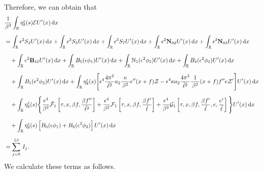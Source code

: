 \documentclass[10pt, reqno]{amsart}
\numberwithin{equation}{section}
\theoremstyle{definition}
\begin{document}
{Therefore, we can obtain that
\begin{align}
& \frac{1}{\beta^3}\int_{\mathbb R}\eta_\delta^\epsilon(s){\mathcal E}U'(x) \,{\mathrm d}x
\nonumber\\[2mm]
& = \int_{{\mathbb R}}\epsilon^2 S_{3} U'(x)\,{\mathrm d}x
+\int_{{\mathbb R}}\epsilon^3 S_{5}U'(x)\,{\mathrm d}x
+\int_{{\mathbb R}}\epsilon^3 S_{7}U'(x)\,{\mathrm d}x
+\int_{{\mathbb R}}\epsilon^2 {\bf N}_{02}U'(x)\,{\mathrm d}x
+\int_{{\mathbb R}}\epsilon^3 {\bf N}_{03}U'(x)\,{\mathrm d}x
\nonumber\\[2mm]
& \quad
+\int_{{\mathbb R}}\epsilon^2 {\bf B}_{42} U'(x)\,{\mathrm d}x
+\int_{{\mathbb R}}B_{5}(\epsilon\phi_1)U'(x)\,{\mathrm d}x
+\int_{{\mathbb R}}\mathbb{N}_1 (\epsilon^2 \phi_2)U'(x)\,{\mathrm d}x
+\int_{{\mathbb R}}B_4(\epsilon^2\phi_2)U'(x)\,{\mathrm d}x
\nonumber\\[2mm]
& \quad
+\int_{{\mathbb R}}B_5 (\epsilon^2{\phi_2}) U'(x)\,{\mathrm d}x
 + \int_{\mathbb R} \eta_\delta^\epsilon(s) \Bigg[ \epsilon^4 \frac{4\pi^2} {{\tilde\ell}^2} a_2\frac{\kappa}{\, \beta^2\, } e'' (x+f)\mathcal Z
 -\epsilon^4 \kappa a_2 \frac{ 4\pi^2} {{\tilde\ell}^2} \frac{1}{\, \beta^2\, } (x+f) f'' e \mathcal Z' \Bigg]U'(x)\,{\mathrm d}x
\nonumber\\[2mm]
& \quad
  + \int_{\mathbb R} \eta_\delta^\epsilon(s)\Bigg\{\frac{\epsilon^4}{\beta^2} \hat{\mathcal F}_1\left[\tau, x, \beta f, \frac{\beta f''}{\tilde\ell^2} \right]
  + \frac{\epsilon^4}{\beta^2} \mathcal F_1\left[\tau, x, \beta f, \frac{\beta f'}{\tilde\ell}\right]
 +\frac{\epsilon^4} {\beta^2} \mathcal G_1\left[\tau, x, \beta f, \frac{\beta f'}{\tilde\ell}, e, \frac{e'}{\tilde\ell}\right]
\Bigg\} U'(x)\,{\mathrm d}x
 \nonumber\\[2mm]
& \quad
 + \int_{\mathbb R} \eta_\delta^\epsilon(s)\, \Big[B_{6}(\epsilon\phi_1)+B_6 (\epsilon^2{\phi_2}) \Big]\,U'(x)\,{\mathrm d}x
\nonumber\\[2mm]
& = \sum_{j=0}^{13}\,I_j .
\end{align}
We calculate these terms as follows.


}
\end{document}
